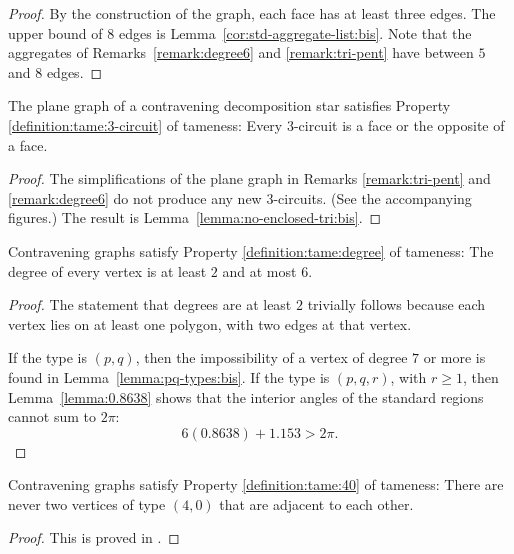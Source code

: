\begin{proof} By the construction of the graph, each face has at
least three edges.  The upper bound of $8$ edges is
Lemma~\ref{cor:std-aggregate-list:bis}.  Note that the aggregates of
Remarks~\ref{remark:degree6} and \ref{remark:tri-pent} have between
$5$ and $8$ edges.
\end{proof}

\begin{proposition} The plane graph of a contravening decomposition star
satisfies Property \ref{definition:tame:3-circuit} of tameness:
Every $3$-circuit is a face or the opposite of a face.
\end{proposition}

\begin{proof}
The simplifications of the plane graph in Remarks
\ref{remark:tri-pent} and \ref{remark:degree6}  do not produce any
new $3$-circuits. (See the accompanying figures.) The result is
Lemma~\ref{lemma:no-enclosed-tri:bis}.
\end{proof}

\begin{proposition} Contravening graphs satisfy Property
\ref{definition:tame:degree} of tameness: The degree of every
vertex is at least $2$ and at most $6$.
\end{proposition}

\begin{proof}
The statement that degrees are at least $2$ trivially follows
because each vertex lies on at least one polygon, with two edges
at that vertex.

If the type is $(p,q)$, then the impossibility of a vertex of
degree $7$ or more is found in Lemma~\ref{lemma:pq-types:bis}.  If
the type is $(p,q,r)$, with $r\ge1$, then Lemma~\ref{lemma:0.8638}
shows that the interior angles of the standard regions cannot sum
to $2\pi$:
    $$6 (0.8638) + 1.153 > 2\pi.$$
\end{proof}

\begin{proposition} Contravening graphs satisfy Property
\ref{definition:tame:40} of tameness: There are never two vertices
of type $(4,0)$ that are adjacent to each other. \end{proposition}

\begin{proof}
This is proved in \cite[4.2]{part1}.
\end{proof}




